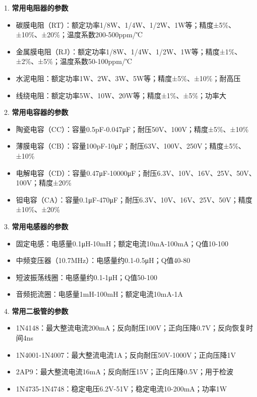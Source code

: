 \documentclass[12pt,UTF8]{ctexbook}
\begin{document}
1. \textbf{常用电阻器的参数}
   \begin{itemize}[leftmargin=3.5em]
   \item 碳膜电阻（RT）：额定功率1/8W、1/4W、1/2W、1W等；精度±5\%、±10\%、±20\%；温度系数200-500ppm/℃
   \item 金属膜电阻（RJ）：额定功率1/8W、1/4W、1/2W、1W等；精度±1\%、±2\%、±5\%；温度系数50-100ppm/℃
   \item 水泥电阻：额定功率1W、2W、3W、5W等；精度±5\%、±10\%；耐高压
   \item 线绕电阻：额定功率5W、10W、20W等；精度±1\%、±5\%；功率大
   \end{itemize}

2. \textbf{常用电容器的参数}
   \begin{itemize}[leftmargin=3.5em]
   \item 陶瓷电容（CC）：容量0.5pF-0.047μF；耐压50V、100V；精度±5\%、±10\%
   \item 薄膜电容（CB）：容量100pF-10μF；耐压63V、100V、250V；精度±5\%、±10\%
   \item 电解电容（CD）：容量0.47μF-10000μF；耐压6.3V、10V、16V、25V、50V、100V；精度±20\%
   \item 钽电容（CA）：容量0.1μF-470μF；耐压6.3V、10V、16V、25V、50V；精度±10\%、±20\%
   \end{itemize}

3. \textbf{常用电感器的参数}
   \begin{itemize}[leftmargin=3.5em]
   \item 固定电感：电感量0.1μH-10mH；额定电流10mA-100mA；Q值10-100
   \item 中频变压器（10.7MHz）：电感量约0.1-0.5μH；Q值40-80
   \item 短波振荡线圈：电感量约0.1-1μH；Q值50-100
   \item 音频扼流圈：电感量1mH-100mH；额定电流10mA-1A
   \end{itemize}

4. \textbf{常用二极管的参数}
   \begin{itemize}[leftmargin=3.5em]
   \item 1N4148：最大整流电流200mA；反向耐压100V；正向压降0.7V；反向恢复时间4ns
   \item 1N4001-1N4007：最大整流电流1A；反向耐压50V-1000V；正向压降1V
   \item 2AP9：最大整流电流16mA；反向耐压15V；正向压降0.5V；用于检波
   \item 1N4735-1N4748：稳定电压6.2V-51V；稳定电流10-200mA；功率1W
   \end{itemize}
\end{document}
